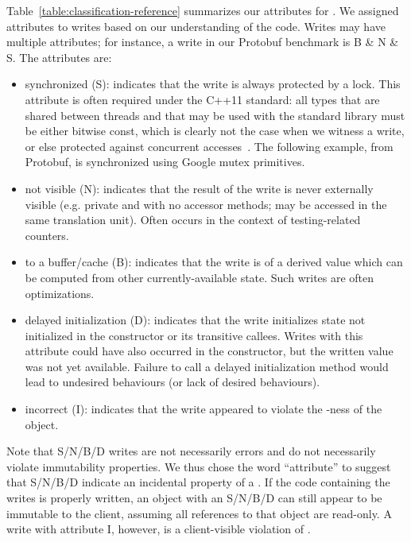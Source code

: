 Table~\ref{table:classification-reference} summarizes our attributes for \wstcqs.
We assigned attributes to writes based on our understanding of the code.
Writes may have multiple attributes; for instance, a
write in our Protobuf benchmark is B \& N \& S.
The attributes are:

\begin{itemize}
  \item synchronized (S): indicates that the write is always protected by a
        lock.
        This attribute is often required under the C++11 standard: all types
        that are shared between threads and that may be used with the standard
        library must be either bitwise const, which is clearly not the case when
        we witness a write, or else protected against concurrent
        accesses~\cite{sutter13:_gotw_solut}.
        The following example, from Protobuf, is synchronized using Google mutex
        primitives.
        \begin{center}
          
        \end{center}
  \item not visible (N): indicates that the result of the write is never
        externally visible (e.g. private and with no accessor methods; may be
        accessed in the same translation unit).
        Often occurs in the context of testing-related counters.
        \begin{center}
          
        \end{center}
  \item to a buffer/cache (B): indicates that the write is of a derived value
        which can be computed from other currently-available state.
        Such writes are often optimizations.
        \begin{center}
          
        \end{center}
  \item delayed initialization (D): indicates that the write initializes state
        not initialized in the constructor or its transitive
        callees.
        Writes with this attribute could have also occurred
        in the constructor, but the written value was not yet
        available.
        Failure to call a delayed initialization method would lead to undesired
        behaviours (or lack of desired behaviours).
        \begin{center}
          
        \end{center}
  \item incorrect (I): indicates that the write appeared to violate the
        \const{}-ness of the object.
\end{itemize}

Note that S/N/B/D writes are not necessarily errors and do not necessarily
violate immutability properties.
We thus chose the word ``attribute'' to suggest that S/N/B/D indicate an
incidental property of a \wtc.
If the code containing the writes is properly written, an object with an
S/N/B/D \wtc{} can still appear to be immutable to the client, assuming all
references to that object are read-only.
A write with attribute I, however, is a client-visible violation of \const{}.

